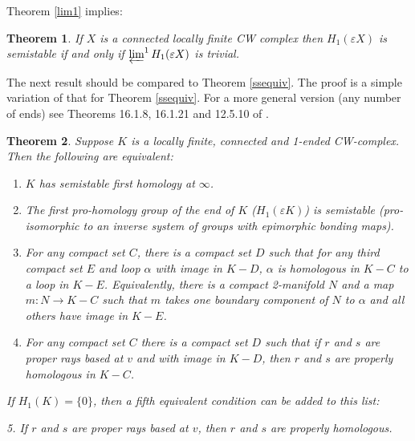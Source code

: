 \documentclass[12pt]{article}
\newtheorem{theorem}{Theorem}[subsection]
\begin{document}
Theorem \ref{lim1} implies:

\begin{theorem}
If $X$ is a connected locally finite CW complex then $H_1(\varepsilon X)$ is semistable if and only if $\varprojlim ^1 H_1(\varepsilon X)$ is trivial. 
\end{theorem}


The next result should be compared to Theorem \ref{ssequiv}. The proof is a simple variation of that for Theorem \ref{ssequiv}. For a more general version (any number of ends) see Theorems 16.1.8, 16.1.21 and 12.5.10 of \cite{G}. 


\begin{theorem}\label{ssequivH} 
Suppose $K$ is a locally finite, connected and 1-ended CW-complex. Then the following are equivalent:
\begin{enumerate}
\item $K$ has  semistable first homology at $\infty$.
\item  The first pro-homology group of the end of $K$ ($H_1(\varepsilon K)$) is semistable (pro-isomorphic to an inverse system of groups with epimorphic bonding maps). 
\item For any compact set $C$, there is a compact set $D$ such that for any third compact set $E$ and loop $\alpha$  with image in $K-D$, $\alpha$ is homologous in $K-C$ to a loop in $K-E$. Equivalently, there is a compact 2-manifold $N$ and a map $m:N\to K-C$ such that $m$ takes one boundary component of $N$ to $\alpha$ and all others have image in $K-E$. 
\item For any compact set $C$ there is a compact set $D$ such that if $r$ and $s$ are proper rays based at $v$ and with image in $K-D$, then $r$ and $s$ are properly homologous in $K-C$. 
\end{enumerate}

If $H_1(K)=\{0\}$, then a fifth equivalent condition can be added to this list:

\medskip

5. If $r$ and $s$ are proper rays based at $v$, then $r$ and $s$ are properly homologous.   
\end{theorem}
\end{document}
